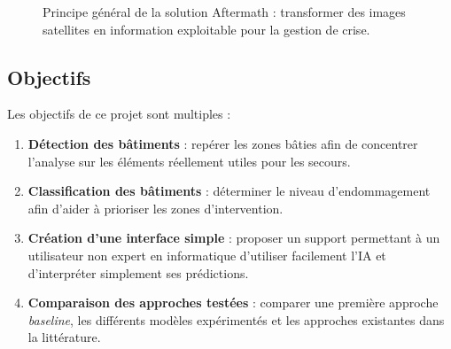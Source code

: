 \documentclass[french,12pt]{article}
\begin{document}
\begin{figure}[H]
    \centering
    \caption{Principe général de la solution Aftermath : transformer des images satellites en information exploitable pour la gestion de crise.}
    \label{fig:principe_aftermath}
\end{figure}

\subsection{Objectifs}

Les objectifs de ce projet sont multiples :
\begin{enumerate}
    \item \textbf{Détection des bâtiments} : repérer les zones bâties afin de concentrer l'analyse sur les éléments réellement utiles pour les secours.
    \item \textbf{Classification des bâtiments} : déterminer le niveau d'endommagement afin d'aider à prioriser les zones d'intervention.
    \item \textbf{Création d'une interface simple} : proposer un support permettant à un utilisateur non expert en informatique d'utiliser facilement l'IA et d'interpréter simplement ses prédictions.
    \item \textbf{Comparaison des approches testées} : comparer une première approche \textit{baseline}, les différents modèles expérimentés et les approches existantes dans la littérature.
\end{enumerate}
\end{document}
